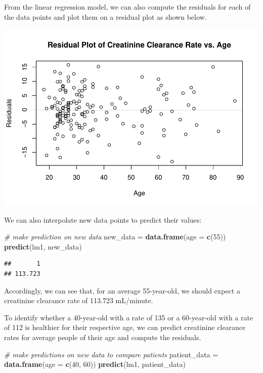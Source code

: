 \documentclass[]{article}
\newenvironment{Shaded}{\begin{snugshade}}{\end{snugshade}}
\newcommand{\CommentTok}[1]{\textcolor[rgb]{0.56,0.35,0.01}{\textit{#1}}}
\newcommand{\DataTypeTok}[1]{\textcolor[rgb]{0.13,0.29,0.53}{#1}}
\newcommand{\DecValTok}[1]{\textcolor[rgb]{0.00,0.00,0.81}{#1}}
\newcommand{\KeywordTok}[1]{\textcolor[rgb]{0.13,0.29,0.53}{\textbf{#1}}}
\newcommand{\NormalTok}[1]{#1}
\newcommand{\StringTok}[1]{\textcolor[rgb]{0.31,0.60,0.02}{#1}}
\begin{document}
From the linear regression model, we can also compute the residuals for
each of the data points and plot them on a residual plot as shown below.

\includegraphics{Report_files/figure-latex/creatinine3-1.pdf}

We can also interpolate new data points to predict their values:

\begin{Shaded}
\begin{Highlighting}[]
\CommentTok{# make prediction on new data}
\NormalTok{new_data =}\StringTok{ }\KeywordTok{data.frame}\NormalTok{(}\DataTypeTok{age =} \KeywordTok{c}\NormalTok{(}\DecValTok{55}\NormalTok{))}
\KeywordTok{predict}\NormalTok{(lm1, new_data)}
\end{Highlighting}
\end{Shaded}

\begin{verbatim}
##       1 
## 113.723
\end{verbatim}

Accordingly, we can see that, for an average 55-year-old, we should
expect a creatinine clearance rate of 113.723 mL/minute.

To identify whether a 40-year-old with a rate of 135 or a 60-year-old
with a rate of 112 is healthier for their respective age, we can predict
creatinine clearance rates for average people of their age and compute
the residuals.

\begin{Shaded}
\begin{Highlighting}[]
\CommentTok{# make predictions on new data to compare patients}
\NormalTok{patient_data =}\StringTok{ }\KeywordTok{data.frame}\NormalTok{(}\DataTypeTok{age =} \KeywordTok{c}\NormalTok{(}\DecValTok{40}\NormalTok{, }\DecValTok{60}\NormalTok{))}
\KeywordTok{predict}\NormalTok{(lm1, patient_data)}
\end{Highlighting}
\end{Shaded}
\end{document}
